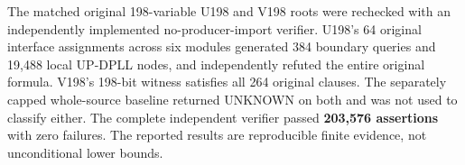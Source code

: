 \documentclass[11pt]{article}
\begin{document}
\begin{center}\end{center}

The matched original 198-variable U198 and V198 roots were rechecked with an independently implemented no-producer-import verifier. U198's 64 original interface assignments across six modules generated 384 boundary queries and 19,488 local UP-DPLL nodes, and independently refuted the entire original formula. V198's 198-bit witness satisfies all 264 original clauses. The separately capped whole-source baseline returned UNKNOWN on both and was not used to classify either. The complete independent verifier passed \textbf{203,576 assertions} with zero failures. The reported results are reproducible finite evidence, not unconditional lower bounds.
\end{document}
